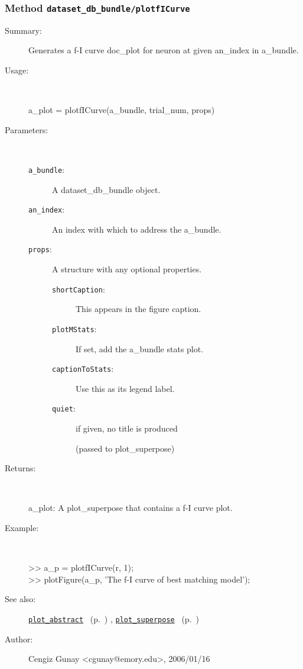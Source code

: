 \subsubsection[Method \texttt{plotfICurve}]{Method \texttt{dataset\_db\_bundle/plotfICurve}}%
%
\label{ref_dataset_db_bundle__plotfICurve}%
\hypertarget{ref_dataset_db_bundle__plotfICurve}{}%
\begin{description}
\item[Summary:]Generates a f-I curve doc\_plot for neuron at given an\_index in a\_bundle.
%
\item[Usage:]~%
\begin{lyxcode}%
a\_plot = plotfICurve(a\_bundle, trial\_num, props)
%
\end{lyxcode}%
%
%
\item[Parameters:]~
\begin{description}%
\item[\texttt{a\_bundle}:]
 A dataset\_db\_bundle object.
\item[\texttt{an\_index}:]
 An index with which to address the a\_bundle.
\item[\texttt{props}:]
 A structure with any optional properties.
\begin{description}%
\item[\texttt{shortCaption}:]
 This appears in the figure caption.
\item[\texttt{plotMStats}:]
 If set, add the a\_bundle stats plot.
\item[\texttt{captionToStats}:]
 Use this as its legend label. 
\item[\texttt{quiet}:]
 if given, no title is produced

(passed to plot\_superpose)
\end{description}%
\end{description}%
%
\item[Returns:
]~

	a\_plot: A plot\_superpose that contains a f-I curve plot.
%
\item[Example:]~
\begin{lyxcode} >> a\_p = plotfICurve(r, 1);
\\%
 >> plotFigure(a\_p, 'The f-I curve of best matching model');
\\%
\end{lyxcode}
%
\item[See also:]%
\hyperlink{ref_plot_abstract}{\texttt{plot\_abstract}}%
\ (p.~\pageref{ref_plot_abstract})%
%
, \hyperlink{ref_plot_superpose}{\texttt{plot\_superpose}}%
\ (p.~\pageref{ref_plot_superpose})%
%
%
\item[Author:]%
Cengiz Gunay <cgunay@emory.edu>, 2006/01/16
%
\end{description}
\methodline%
